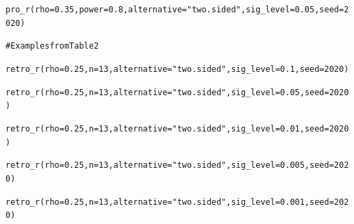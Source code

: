 \documentclass{article}\usepackage[]{graphicx}\usepackage[]{color}
\makeatletter
\newcommand{\hlnum}[1]{\textcolor[rgb]{0.063,0.58,0.627}{#1}}%
\newcommand{\hlstr}[1]{\textcolor[rgb]{0.063,0.58,0.627}{#1}}%
\newcommand{\hlcom}[1]{\textcolor[rgb]{0.588,0.588,0.588}{#1}}%
\newcommand{\hlstd}[1]{\textcolor[rgb]{0.196,0.196,0.196}{#1}}%
\newcommand{\hlkwc}[1]{\textcolor[rgb]{0,0.631,0.314}{#1}}%
\newcommand{\hlkwd}[1]{\textcolor[rgb]{0.78,0.227,0.412}{#1}}%
\newenvironment{kframe}{%
 \def\at@end@of@kframe{}%
 \ifinner\ifhmode%
  \def\at@end@of@kframe{\end{minipage}}%
  \begin{minipage}{\columnwidth}%
 \fi\fi%
 \def\FrameCommand##1{\hskip\@totalleftmargin \hskip-\fboxsep
 \colorbox{shadecolor}{##1}\hskip-\fboxsep
     \hskip-\linewidth \hskip-\@totalleftmargin \hskip\columnwidth}%
 \MakeFramed {\advance\hsize-\width
   \@totalleftmargin\z@ \linewidth\hsize
   \@setminipage}}%
 {\par\unskip\endMakeFramed%
 \at@end@of@kframe}
\newenvironment{knitrout}{}{} %
\makeatother
\begin{document}
\begin{refsection}
\begin{knitrout}
\begin{kframe}
\begin{alltt}
\hlkwd{pro_r}\hlstd{(}\hlkwc{rho} \hlstd{=} \hlnum{0.35}\hlstd{,} \hlkwc{power} \hlstd{=} \hlnum{0.8}\hlstd{,} \hlkwc{alternative} \hlstd{=} \hlstr{"two.sided"}\hlstd{,} \hlkwc{sig_level} \hlstd{=} \hlnum{0.05}\hlstd{,} \hlkwc{seed} \hlstd{=} \hlnum{2020}\hlstd{)}
\end{alltt}
\end{kframe}
\end{knitrout}

\begin{knitrout}
\color{fgcolor}\begin{kframe}
\begin{alltt}
\hlcom{# Examples from Table 2}

\hlkwd{retro_r}\hlstd{(}\hlkwc{rho} \hlstd{=} \hlnum{0.25}\hlstd{,} \hlkwc{n} \hlstd{=} \hlnum{13}\hlstd{,} \hlkwc{alternative} \hlstd{=} \hlstr{"two.sided"}\hlstd{,} \hlkwc{sig_level} \hlstd{=} \hlnum{0.1}\hlstd{,} \hlkwc{seed} \hlstd{=} \hlnum{2020}\hlstd{)}

\hlkwd{retro_r}\hlstd{(}\hlkwc{rho} \hlstd{=} \hlnum{0.25}\hlstd{,} \hlkwc{n} \hlstd{=} \hlnum{13}\hlstd{,} \hlkwc{alternative} \hlstd{=} \hlstr{"two.sided"}\hlstd{,} \hlkwc{sig_level} \hlstd{=} \hlnum{0.05}\hlstd{,} \hlkwc{seed} \hlstd{=} \hlnum{2020}\hlstd{)}

\hlkwd{retro_r}\hlstd{(}\hlkwc{rho} \hlstd{=} \hlnum{0.25}\hlstd{,} \hlkwc{n} \hlstd{=} \hlnum{13}\hlstd{,} \hlkwc{alternative} \hlstd{=} \hlstr{"two.sided"}\hlstd{,} \hlkwc{sig_level} \hlstd{=} \hlnum{0.01}\hlstd{,} \hlkwc{seed} \hlstd{=} \hlnum{2020}\hlstd{)}

\hlkwd{retro_r}\hlstd{(}\hlkwc{rho} \hlstd{=} \hlnum{0.25}\hlstd{,} \hlkwc{n} \hlstd{=} \hlnum{13}\hlstd{,} \hlkwc{alternative} \hlstd{=} \hlstr{"two.sided"}\hlstd{,} \hlkwc{sig_level} \hlstd{=} \hlnum{0.005}\hlstd{,} \hlkwc{seed} \hlstd{=} \hlnum{2020}\hlstd{)}

\hlkwd{retro_r}\hlstd{(}\hlkwc{rho} \hlstd{=} \hlnum{0.25}\hlstd{,} \hlkwc{n} \hlstd{=} \hlnum{13}\hlstd{,} \hlkwc{alternative} \hlstd{=} \hlstr{"two.sided"}\hlstd{,} \hlkwc{sig_level} \hlstd{=} \hlnum{0.001}\hlstd{,} \hlkwc{seed} \hlstd{=} \hlnum{2020}\hlstd{)}
\end{alltt}
\end{kframe}
\end{knitrout}

\printbibliography[heading=subbibliography, title = Appendix References ]
\end{refsection}
\end{document}
